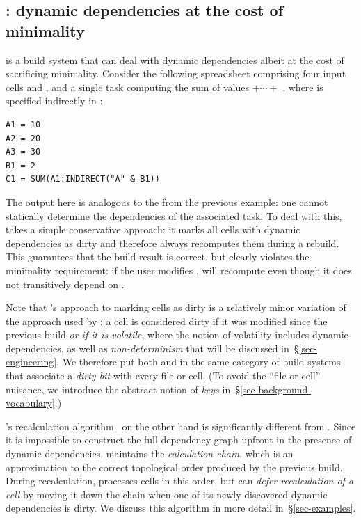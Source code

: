 \subsection{\Excel: dynamic dependencies at the cost of minimality}
\label{sec-background-excel}

\Excel is a build system that can deal with dynamic dependencies albeit at the
cost of sacrificing minimality. Consider the following spreadsheet comprising
four input cells  and , and a single task computing the sum
of values  $+\cdots+$ , where  is specified indirectly in
:

\vspace{1mm}
\begin{verbatim}
A1 = 10
A2 = 20
A3 = 30
B1 = 2
C1 = SUM(A1:INDIRECT("A" & B1))
\end{verbatim}
\vspace{1mm}

\noindent
The output  here is analogous to the  from the previous
example: one cannot statically determine the dependencies of the associated task.
To deal with this, \Excel takes a simple conservative approach: it marks all
cells with dynamic dependencies as dirty and therefore always recomputes them
during a rebuild. This guarantees that the build result is correct, but clearly
violates the minimality requirement: if the user modifies , \Excel will
recompute  even though it does not transitively depend on .

Note that \Excel's approach to marking cells as dirty is a relatively minor
variation of the approach used by \Make: a cell is considered dirty if it was
modified since the previous build \emph{or if it is volatile}, where the notion
of volatility includes dynamic dependencies, as well as \emph{non-determinism}
that will be discussed in~\S\ref{sec-engineering}. We therefore put both \Make
and \Excel in the same category of build systems that associate a \emph{dirty bit}
with every file or cell. (To avoid the ``file or cell'' nuisance, we introduce the
abstract notion of \emph{keys} in~\S\ref{sec-background-vocabulary}.)

\Excel's recalculation algorithm~\cite{excel_recalc} on the other hand is
significantly different from \Make. Since it is impossible to construct the full
dependency graph upfront in the presence of dynamic dependencies, \Excel
maintains the \emph{calculation chain}, which is an approximation to the correct
topological order produced by the previous build. During recalculation, \Excel
processes cells in this order, but can \emph{defer recalculation of a cell} by
moving it down the chain when one of its newly discovered dynamic dependencies
is dirty. We discuss this algorithm in more detail in~\S\ref{sec-examples}.

